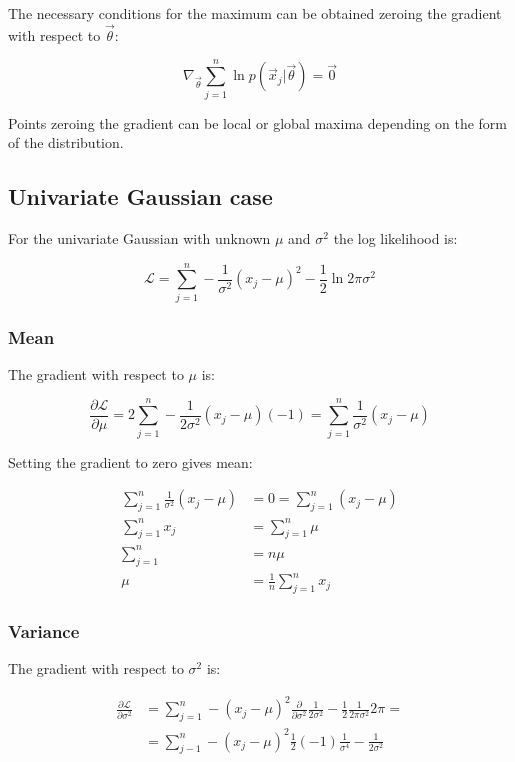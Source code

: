 	The necessary conditions for the maximum can be obtained zeroing the gradient with respect to $\vec{\theta}$:

	$$\nabla_{\vec{\theta}}\sum\limits_{j=1}^n\ln p(\vec{x}_j|\vec{\theta}) = \vec{0}$$

	Points zeroing the gradient can be local or global maxima depending on the form of the distribution.

	\subsection{Univariate Gaussian case}
	For the univariate Gaussian with unknown $\mu$ and $\sigma^2$ the log likelihood is:

	$$\mathcal{L} = \sum\limits_{j=1}^n-\frac{1}{\sigma^2}(x_j-\mu)^2-\frac{1}{2}\ln 2\pi\sigma^2$$

		\subsubsection{Mean}
		The gradient with respect to $\mu$ is:

		$$\frac{\partial\mathcal{L}}{\partial\mu} = 2\sum\limits_{j=1}^n-\frac{1}{2\sigma^2}(x_j - \mu)(-1) = \sum\limits_{j=1}^n\frac{1}{\sigma^2}(x_j-\mu)$$

		Setting the gradient to zero gives mean:

		\begin{align*}
			\sum\limits_{j=1}^n\frac{1}{\sigma^2}(x_j-\mu) &= 0 = \sum\limits_{j=1}^n(x_j-\mu)\\
			\sum\limits_{j=1}^n x_j &= \sum\limits_{j=1}^n\mu\\
			\sum\limits_{j=1}^n & = n\mu\\
			\mu &= \frac{1}{n}\sum\limits_{j=1}^nx_j
		\end{align*}

		\subsubsection{Variance}
		The gradient with respect to $\sigma^2$ is:

		\begin{align*}
			\frac{\partial\mathcal{L}}{\partial\sigma^2} &= \sum\limits_{j=1}^n-(x_j-\mu)^2\frac{\partial}{\partial\sigma^2}\frac{1}{2\sigma^2}-\frac{1}{2}\frac{1}{2\pi\sigma^2}2\pi = \\
																									 &=\sum\limits_{j-1}^n - (x_j - \mu)^2\frac{1}{2}(-1)\frac{1}{\sigma^4}-\frac{1}{2\sigma^2}
		\end{align*}


